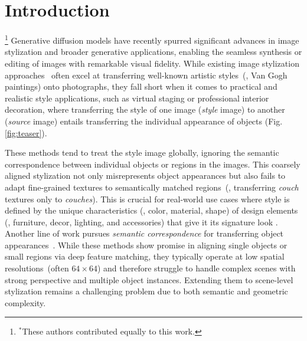 \section{Introduction}
{\let\thefootnote\relax\footnote{{$^*$These authors contributed equally to this work.}}}
Generative diffusion models have recently spurred significant advances in image stylization and broader generative applications, enabling the seamless synthesis or editing of images with remarkable visual fidelity.
While existing image stylization approaches~\cite{chung2024styleid,li2024diffstyler} often excel at transferring well-known artistic styles~(\eg, Van Gogh paintings) onto photographs, they fall short when it comes to practical and realistic style applications, such as virtual staging or professional interior decoration, where transferring the style of one image (\textit{style} image) to another (\textit{source} image) entails transferring the individual appearance of objects (Fig. \ref{fig:teaser}).

These methods tend to treat the style image globally, ignoring the semantic correspondence between individual objects or regions in the images.
This coarsely aligned stylization not only misrepresents object appearances but also fails to adapt fine-grained textures to semantically matched regions~(\eg, transferring \emph{couch} textures only to \emph{couches}). 
This is crucial for real-world use cases where style is defined by the unique characteristics (\eg, color, material, shape) of design elements (\ie, furniture, decor, lighting, and accessories) that give it its signature look \cite{park2022analysis}. 
Another line of work pursues \textit{semantic correspondence} for transferring object appearances~\cite{cheng2024zeroshot,zhang2023tale}.
While these methods show promise in aligning single objects or small regions via deep feature matching, they typically operate at low spatial resolutions~(often $64\times64$) and therefore struggle to handle complex scenes with strong perspective and multiple object instances.
Extending them to scene-level stylization remains a challenging problem due to both semantic and geometric complexity.

